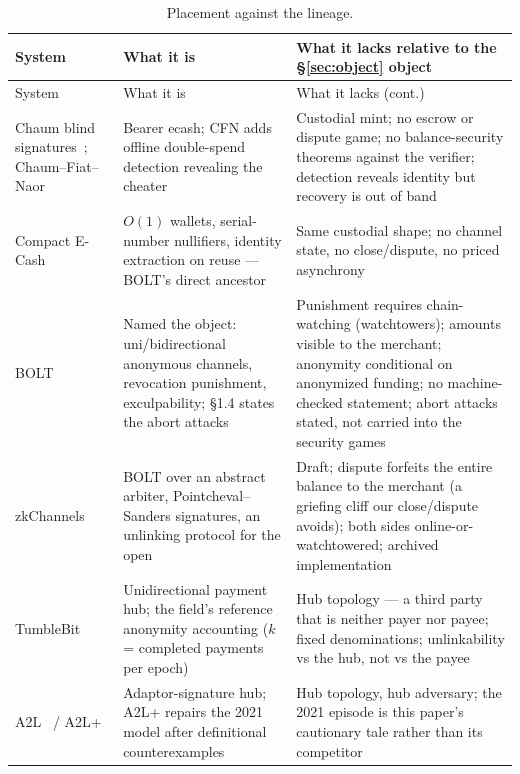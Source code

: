\documentclass[9pt]{extarticle}
\begin{document}
\begin{footnotesize}
\begin{longtable}{>{\raggedright\arraybackslash}p{}>{\raggedright\arraybackslash}p{}>{\raggedright\arraybackslash}p{}}
\caption{Placement against the lineage.}\label{tab:placement}\\
\toprule
System & What it is & What it lacks relative to the \S\ref{sec:object} object \\
\midrule
\endfirsthead
\toprule
System & What it is & What it lacks (cont.) \\
\midrule
\endhead
\bottomrule
\endfoot
Chaum blind signatures~\cite{chaum1983}; Chaum--Fiat--Naor~\cite{cfn1990} &
Bearer ecash; CFN adds offline double-spend detection revealing the cheater &
Custodial mint; no escrow or dispute game; no balance-security theorems against the verifier; detection reveals identity but recovery is out of band \\
\addlinespace
Compact E-Cash~\cite{compactecash2005} &
$O(1)$ wallets, serial-number nullifiers, identity extraction on reuse --- BOLT's direct ancestor &
Same custodial shape; no channel state, no close/dispute, no priced asynchrony \\
\addlinespace
BOLT~\cite{greenmiers2017bolt} &
Named the object: uni/bidirectional anonymous channels, revocation punishment, exculpability; \S1.4 states the abort attacks &
Punishment requires chain-watching (watchtowers); amounts visible to the merchant; anonymity conditional on anonymized funding; no machine-checked statement; abort attacks stated, not carried into the security games \\
\addlinespace
zkChannels~\cite{zkchannels2021} &
BOLT over an abstract arbiter, Pointcheval--Sanders signatures, an unlinking protocol for the open &
Draft; dispute forfeits the entire balance to the merchant (a griefing cliff our close/dispute avoids); both sides online-or-watchtowered; archived implementation~\cite{libzkchannels} \\
\addlinespace
TumbleBit~\cite{tumblebit2017} &
Unidirectional payment hub; the field's reference anonymity accounting ($k$ = completed payments per epoch) &
Hub topology --- a third party that is neither payer nor payee; fixed denominations; unlinkability vs the hub, not vs the payee \\
\addlinespace
A2L~\cite{a2l2021} / A2L+~\cite{glaeser2022bcs} &
Adaptor-signature hub; A2L+ repairs the 2021 model after definitional counterexamples &
Hub topology, hub adversary; the 2021 episode is this paper's cautionary tale rather than its competitor \\

\end{longtable}
\end{footnotesize}
\end{document}
